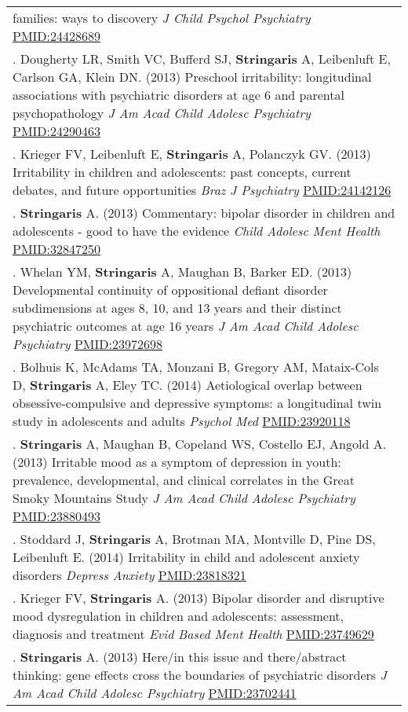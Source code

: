 \documentclass[
]{article}
\begin{document}
\begin{longtable}[]{@{}
  >{\raggedright\arraybackslash}p{}@{}}
families: ways to discovery \emph{J Child Psychol Psychiatry}
\url{PMID:24428689} \\
155. Dougherty LR, Smith VC, Bufferd SJ, \textbf{Stringaris} A,
Leibenluft E, Carlson GA, Klein DN. (2013) Preschool irritability:
longitudinal associations with psychiatric disorders at age 6 and
parental psychopathology \emph{J Am Acad Child Adolesc Psychiatry}
\url{PMID:24290463} \\
156. Krieger FV, Leibenluft E, \textbf{Stringaris} A, Polanczyk GV.
(2013) Irritability in children and adolescents: past concepts, current
debates, and future opportunities \emph{Braz J Psychiatry}
\url{PMID:24142126} \\
157. \textbf{Stringaris} A. (2013) Commentary: bipolar disorder in
children and adolescents - good to have the evidence \emph{Child Adolesc
Ment Health} \url{PMID:32847250} \\
158. Whelan YM, \textbf{Stringaris} A, Maughan B, Barker ED. (2013)
Developmental continuity of oppositional defiant disorder subdimensions
at ages 8, 10, and 13 years and their distinct psychiatric outcomes at
age 16 years \emph{J Am Acad Child Adolesc Psychiatry}
\url{PMID:23972698} \\
159. Bolhuis K, McAdams TA, Monzani B, Gregory AM, Mataix-Cols D,
\textbf{Stringaris} A, Eley TC. (2014) Aetiological overlap between
obsessive-compulsive and depressive symptoms: a longitudinal twin study
in adolescents and adults \emph{Psychol Med} \url{PMID:23920118} \\
160. \textbf{Stringaris} A, Maughan B, Copeland WS, Costello EJ, Angold
A. (2013) Irritable mood as a symptom of depression in youth:
prevalence, developmental, and clinical correlates in the Great Smoky
Mountains Study \emph{J Am Acad Child Adolesc Psychiatry}
\url{PMID:23880493} \\
161. Stoddard J, \textbf{Stringaris} A, Brotman MA, Montville D, Pine
DS, Leibenluft E. (2014) Irritability in child and adolescent anxiety
disorders \emph{Depress Anxiety} \url{PMID:23818321} \\
162. Krieger FV, \textbf{Stringaris} A. (2013) Bipolar disorder and
disruptive mood dysregulation in children and adolescents: assessment,
diagnosis and treatment \emph{Evid Based Ment Health}
\url{PMID:23749629} \\
163. \textbf{Stringaris} A. (2013) Here/in this issue and there/abstract
thinking: gene effects cross the boundaries of psychiatric disorders
\emph{J Am Acad Child Adolesc Psychiatry} \url{PMID:23702441} \\

\end{longtable}
\end{document}

